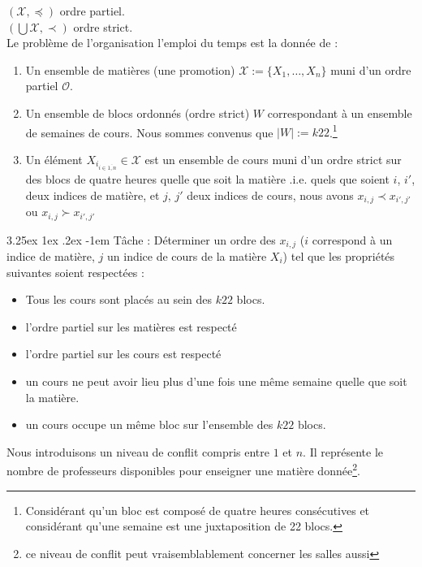 \documentclass[12pt,a4paper,french]{article}
\makeatletter
\renewcommand\paragraph{\@startsection{paragraph}{5}{\z@}%
  {3.25ex \@plus1ex \@minus.2ex}%
  {-1em}%
  {\normalfont\normalsize\bfseries}}
\makeatother
\begin{document}
$(\mathcal{X},\preceq)$ ordre partiel. \\
$(\bigcup\mathcal{X},\prec)$ ordre strict. \\


Le problème de l'organisation l'emploi du temps est la donnée de : 
\begin{enumerate}
\item Un ensemble de matières (une promotion) $\mathcal{X}:=\{X_{1},\dots, X_{n}\}$ muni d'un ordre partiel $\mathcal{O}$. \item Un ensemble de blocs ordonnés (ordre strict) $W$ correspondant à un ensemble de semaines de cours. Nous sommes convenus que $|W|:=k22$.\footnote{Considérant qu'un bloc est composé de quatre heures consécutives et considérant qu'une semaine est une juxtaposition de 22 blocs.}
\item Un élément $X_{i_{i\in\overline{1,n}}}\in\mathcal{X}$ est un ensemble de cours muni d'un ordre strict sur des blocs de quatre heures quelle que soit la matière .i.e. quels que soient $i$, $i'$, deux indices de matière, et $j$, $j'$ deux indices de cours, nous avons $x_{i,j} \prec x_{i',j'}$ ou $x_{i,j} \succ x_{i',j'}$


\end{enumerate} 

\paragraph{Tâche : } Déterminer un ordre des $x_{i,j}$ ($i$ correspond à un indice de matière, $j$ un indice de cours de la matière $X_{i}$) tel que les propriétés suivantes soient respectées :
\begin{itemize}
\item Tous les cours sont placés au sein des $k22$ blocs.
\item l'ordre partiel sur les matières est respecté
\item l'ordre partiel sur les cours est respecté
\item un cours ne peut avoir lieu plus d'une fois une même semaine quelle que soit la matière.
\item un cours occupe un même bloc sur l'ensemble des $k22$ blocs.
\end{itemize}   

Nous introduisons un niveau de conflit compris entre $1$ et $n$. Il représente le nombre de professeurs disponibles pour enseigner une matière donnée\footnote{ce niveau de conflit peut vraisemblablement concerner les salles aussi}.
\end{document}
